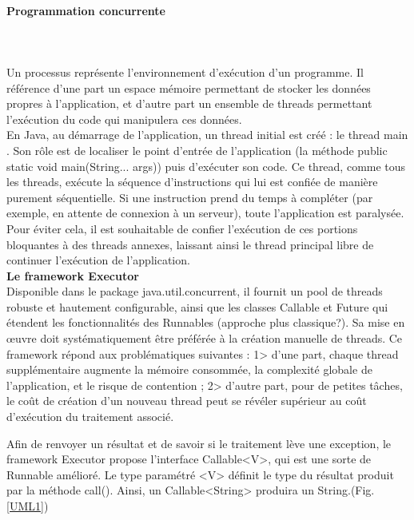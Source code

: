 \begin{itemize}
\paragraph{Programmation concurrente}\\ \label{Threads}
~\\

Un processus représente l'environnement d'exécution d'un programme. Il référence d'une part un espace mémoire permettant de stocker les données propres à l'application, et d'autre part un ensemble de threads permettant l'exécution du code qui manipulera ces données.\\

En Java, au démarrage de l'application, un thread initial est créé : le thread \og main \fg. Son rôle est de localiser le point d'entrée de l'application (la méthode public static void main(String... args)) puis d'exécuter son code.
Ce thread, comme tous les threads, exécute la séquence d'instructions qui lui est confiée de manière purement séquentielle. Si une instruction prend du temps à compléter (par exemple, en attente de connexion à un serveur), toute l'application est paralysée.\\

Pour éviter cela, il est souhaitable de confier l'exécution de ces portions bloquantes à des threads annexes, laissant ainsi le thread principal libre de continuer l'exécution de l'application.\\

\textbf{Le framework \og Executor \fg}
~\\
Disponible dans le package java.util.concurrent, il fournit un pool de threads robuste et hautement configurable, ainsi que les classes Callable et Future qui étendent les fonctionnalités des Runnables (approche plus classique?). Sa mise en œuvre doit systématiquement être préférée à la création manuelle de threads. Ce framework répond aux problématiques suivantes :
1> d'une part, chaque thread supplémentaire augmente la mémoire consommée, la complexité globale de l'application, et le risque de contention ;
2> d'autre part, pour de petites tâches, le coût de création d'un nouveau thread peut se révéler supérieur au coût d'exécution du traitement associé.

Afin de renvoyer un résultat et de savoir si le traitement lève une exception, le framework \og Executor \fg propose l'interface Callable<V>, qui est une sorte de Runnable amélioré. Le type paramétré <V> définit le type du résultat produit par la méthode call(). Ainsi, un Callable<String> produira un String.(Fig. \ref{UML1})\\


\end{itemize}
